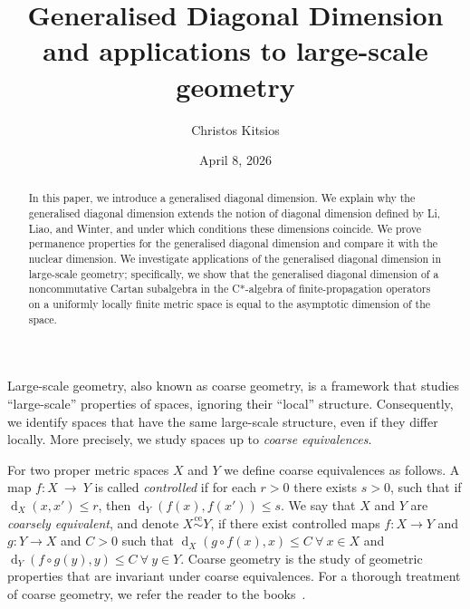 \documentclass[a4paper]{amsart}
\newcommand{\myhyp}{\textnormal{-}\hskip0pt\relax}
\numberwithin{equation}{section}
\newcommand{\coaEq}{\overset{\mathrm{ce}}{\sim}}
\newcommand{\rAr}{\longrightarrow}
\DeclareMathOperator{\dist}{d}
\theoremstyle{plain}
\theoremstyle{indented}
\numberwithin{equation}{section}
\theoremstyle{definition}
\theoremstyle{remark}
\theoremstyle{plain}
\theoremstyle{definition}
\begin{document}
\title[Generalised Diagonal Dimension]{Generalised Diagonal Dimension and applications to large-scale geometry}
\date{April 8, 2026}

\begin{abstract}
In this paper, we introduce a generalised diagonal dimension.
We explain why the generalised diagonal dimension extends the notion of diagonal dimension defined by Li, Liao, and Winter, and under which conditions these dimensions coincide. 
We prove permanence properties for the generalised diagonal dimension and compare it with the nuclear dimension. 
We investigate applications of the generalised diagonal dimension in large-scale geometry;
specifically, we show that the generalised diagonal dimension of a noncommutative Cartan subalgebra in the C*-algebra of finite-propagation operators on a uniformly locally finite metric space is equal to the asymptotic dimension of the space. 

\end{abstract}

\author{Christos Kitsios}
\address{Mathematisches Institut, Georg-August-Universit\"{a}t G\"{o}ttingen, Bunsenstr. 3-5, 37073 G\"{o}ttingen, Germany.}

\maketitle


Large-scale geometry, also known as coarse geometry, is a framework that studies
``large\myhyp{}scale'' properties of spaces, ignoring their ``local'' structure.
Consequently, we identify spaces that have the same large-scale structure, 
even if they differ locally.
More precisely, we study spaces up to \emph{coarse equivalences}.


For two proper metric spaces $X$ and $Y$ 
we define coarse equivalences 
as follows.
A map
${f \colon X~\rAr~Y}$ is called \emph{controlled} if for each ${r>0}$
there exists ${s>0}$, such that if 
${\dist_X(x,x')\le r}$, 
then 
${\dist_Y(f(x),f(x'))\le s}$.
We say that $X$ and $Y$ are \emph{coarsely equivalent}, and denote ${{X}\coaEq{Y}}$,
if there exist controlled maps ${f \colon X \rAr Y}$ and ${g\colon Y \rAr X}$ and
${C>0}$ such that ${\dist_X({g}\circ{f}(x),x)\le C~\forall~x \in X}$ and ${\dist_Y({f}\circ{g}(y),y)\le C~\forall~y \in Y}$.
Coarse geometry is the study of geometric properties that are invariant under coarse equivalences.
For a thorough treatment of coarse geometry, we refer the reader to  the books~\cite{NowakYu2023LargeScaleGeometry, Roe1996IndexTheoryCoarseGeometryTopology, Roe2003lecturesCrsGeometry}.
\end{document}
